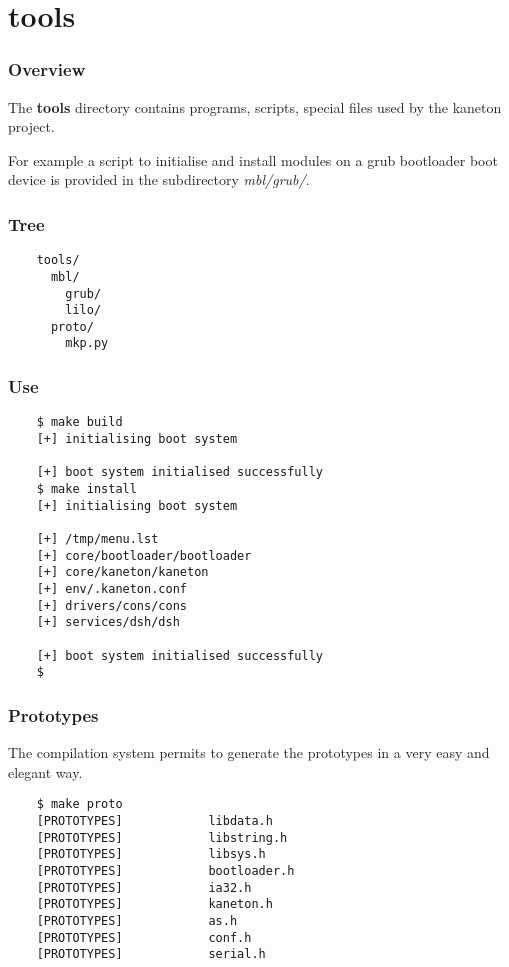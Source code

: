 {\section{tools}


\begin{frame}
  \frametitle{Overview}

  The \textbf{tools} directory contains programs, scripts, special
  files used by the kaneton project.

  \nl

  For example a script to initialise and install modules on a grub
  bootloader boot device is provided in the subdirectory
  \textit{mbl/grub/}.
\end{frame}


\begin{frame}[containsverbatim]
  \frametitle{Tree}

  \begin{verbatim}
    tools/
      mbl/
        grub/
        lilo/
      proto/
        mkp.py
  \end{verbatim}
\end{frame}


\begin{frame}[containsverbatim]
  \frametitle{Use}

  \begin{verbatim}
    $ make build
    [+] initialising boot system

    [+] boot system initialised successfully
    $ make install
    [+] initialising boot system

    [+] /tmp/menu.lst
    [+] core/bootloader/bootloader
    [+] core/kaneton/kaneton
    [+] env/.kaneton.conf
    [+] drivers/cons/cons
    [+] services/dsh/dsh

    [+] boot system initialised successfully
    $
  \end{verbatim}
\end{frame}


\begin{frame}[containsverbatim]
  \frametitle{Prototypes}

  The compilation system permits to generate the prototypes in a very easy
  and elegant way.

  \begin{verbatim}
    $ make proto
    [PROTOTYPES]            libdata.h
    [PROTOTYPES]            libstring.h
    [PROTOTYPES]            libsys.h
    [PROTOTYPES]            bootloader.h
    [PROTOTYPES]            ia32.h
    [PROTOTYPES]            kaneton.h
    [PROTOTYPES]            as.h
    [PROTOTYPES]            conf.h
    [PROTOTYPES]            serial.h


\end{verbatim}
\end{frame}}
